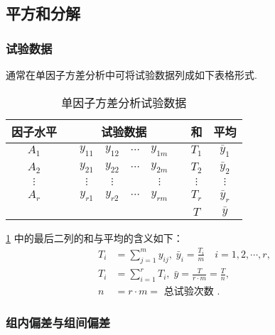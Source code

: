 \subsection{平方和分解}\label{ssec:8.1.3}
\subsubsection{试验数据}

通常在单因子方差分析中可将试验数据列成如下表格形式.

\begin{table}[htbp]
  \centering
  \caption{单因子方差分析试验数据}
    \begin{tabular}{ccccccccc}
    \toprule
    因子水平  &       & \multicolumn{4}{c}{试验数据}      &       & 和     & 平均 \\
    \midrule
    $A_1$    &       & $y_{11}$   & $y_{12}$   & $\cdots$ & $y_{1m}$   &       & $T_1$    & $\bar{y}_{1}$ \\
    $A_2$    &       & $y_{21}$   & $y_{22}$   & $\cdots$  & $y_{2m}$   &       & $T_2$    & $\bar{y}_{2}$ \\
    $\vdots$ &       & $\vdots$    & $\vdots$   &       &   $\vdots$  &       &  $\vdots$   & $\vdots$ \\
    $A_r$    &       & $y_{r1}$   & $y_{r2}$   & $\cdots$   & $y_{rm}$   &       & $T_r$    & $\bar{y}_{r}$ \\
    \midrule
          &       &       &       &       &       &       & $T$     & $\bar{y}$ \\
    \bottomrule
    \end{tabular}%
  \label{tab:8.1.2}%
\end{table}%
\ref{tab:8.1.2} 中的最后二列的和与平均的含义如下：
\begin{align*}
  T_i &= \sum_{j=1}^{m} y_{ij},\; \bar{y}_i = \frac{T_i}{m} \quad i =1,2,\cdots,r,\\
  T_i & = \sum_{i=1}^{r} T_{i},\; \bar{y} = \frac{T}{r \cdot m} = \frac{T}{n},\\
  n & = r \cdot m = \text{ 总试验次数 }.
\end{align*}

\subsubsection{组内偏差与组间偏差}

